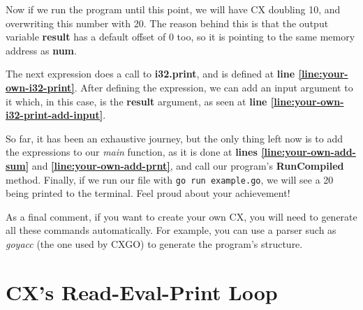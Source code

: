 \documentclass[11pt,fleqn,openany]{book} %
\begin{document}
Now if we run the program until this point, we will have CX doubling 10, and overwriting this number with 20. The reason behind this is that the output variable \textbf{result} has a default offset of 0 too, so it is pointing to the same memory address as \textbf{num}.

The next expression does a call to \textbf{i32.print}, and is defined at \textbf{line \ref{line:your-own-i32-print}}. After defining the expression, we can add an input argument to it which, in this case, is the \textbf{result} argument, as seen at \textbf{line \ref{line:your-own-i32-print-add-input}}.

So far, it has been an exhaustive journey, but the only thing left now is to add the expressions to our \emph{main} function, as it is done at \textbf{lines \ref{line:your-own-add-sum}} and \textbf{\ref{line:your-own-add-prnt}}, and call our program's \textbf{RunCompiled} method. Finally, if we run our file with \lstinline{go run example.go}, we will see a 20 being printed to the terminal. Feel proud about your achievement!

As a final comment, if you want to create your own CX, you will need to generate all these commands automatically. For example, you can use a parser such as \emph{goyacc} (the one used by CXGO) to generate the program's structure. 


\chapter{CX's Read-Eval-Print Loop}
\label{chapter:mastering-the-repl}

\end{document}
